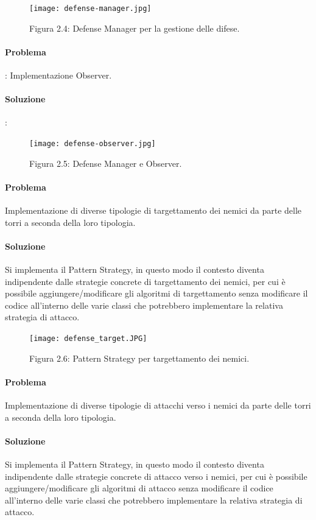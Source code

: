 \documentclass[a4paper,12pt]{report}
\begin{document}
\begin{figure}[H]
    \centering
    \texttt{[image: defense-manager.jpg]}
    \caption{Figura 2.4: Defense Manager per la gestione delle difese.}
    \label{fig:defense-manager}
\end{figure}

\paragraph{Problema}:
Implementazione Observer.
\paragraph{Soluzione}:

\begin{figure}[H]
    \centering
    \texttt{[image: defense-observer.jpg]}
    \caption{Figura 2.5: Defense Manager e Observer.}
    \label{fig:defense-observer}
\end{figure}

\paragraph{Problema}
Implementazione di diverse tipologie di targettamento dei nemici da parte delle torri a seconda della loro tipologia.
\paragraph{Soluzione}
Si implementa il Pattern Strategy, in questo modo il contesto diventa indipendente dalle strategie concrete di targettamento dei nemici, per cui è possibile aggiungere/modificare gli algoritmi di targettamento senza modificare il codice all'interno delle varie classi che potrebbero implementare la relativa strategia di attacco.

\begin{figure}[H]
    \centering
    \texttt{[image: defense\_target.JPG]}
    \caption{Figura 2.6: Pattern Strategy per targettamento dei nemici.}
    \label{fig:defense_target}
\end{figure}

\paragraph{Problema}
Implementazione di diverse tipologie di attacchi verso i nemici da parte delle torri a seconda della loro tipologia.
\paragraph{Soluzione}
Si implementa il Pattern Strategy, in questo modo il contesto diventa indipendente dalle strategie concrete di attacco verso i nemici, per cui è possibile aggiungere/modificare gli algoritmi di attacco senza modificare il codice all'interno delle varie classi che potrebbero implementare la relativa strategia di attacco.
\end{document}
